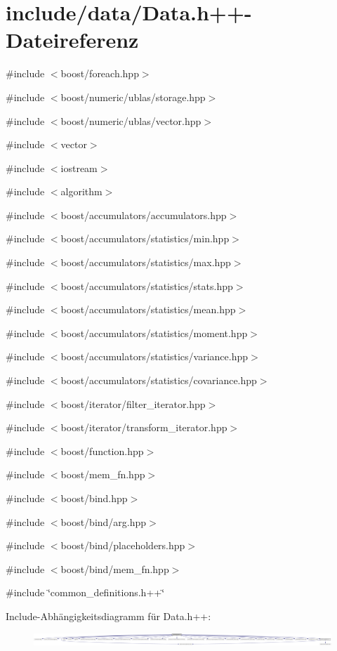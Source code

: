 \hypertarget{Data_8h_09_09}{
\section{include/data/Data.h++-\/Dateireferenz}
\label{Data_8h_09_09}
}
{\ttfamily \#include $<$boost/foreach.hpp$>$}\par
{\ttfamily \#include $<$boost/numeric/ublas/storage.hpp$>$}\par
{\ttfamily \#include $<$boost/numeric/ublas/vector.hpp$>$}\par
{\ttfamily \#include $<$vector$>$}\par
{\ttfamily \#include $<$iostream$>$}\par
{\ttfamily \#include $<$algorithm$>$}\par
{\ttfamily \#include $<$boost/accumulators/accumulators.hpp$>$}\par
{\ttfamily \#include $<$boost/accumulators/statistics/min.hpp$>$}\par
{\ttfamily \#include $<$boost/accumulators/statistics/max.hpp$>$}\par
{\ttfamily \#include $<$boost/accumulators/statistics/stats.hpp$>$}\par
{\ttfamily \#include $<$boost/accumulators/statistics/mean.hpp$>$}\par
{\ttfamily \#include $<$boost/accumulators/statistics/moment.hpp$>$}\par
{\ttfamily \#include $<$boost/accumulators/statistics/variance.hpp$>$}\par
{\ttfamily \#include $<$boost/accumulators/statistics/covariance.hpp$>$}\par
{\ttfamily \#include $<$boost/iterator/filter\_\-iterator.hpp$>$}\par
{\ttfamily \#include $<$boost/iterator/transform\_\-iterator.hpp$>$}\par
{\ttfamily \#include $<$boost/function.hpp$>$}\par
{\ttfamily \#include $<$boost/mem\_\-fn.hpp$>$}\par
{\ttfamily \#include $<$boost/bind.hpp$>$}\par
{\ttfamily \#include $<$boost/bind/arg.hpp$>$}\par
{\ttfamily \#include $<$boost/bind/placeholders.hpp$>$}\par
{\ttfamily \#include $<$boost/bind/mem\_\-fn.hpp$>$}\par
{\ttfamily \#include \char`\"{}common\_\-definitions.h++\char`\"{}}\par
Include-\/Abhängigkeitsdiagramm für Data.h++:\nopagebreak
\begin{figure}[H]
\begin{center}
\leavevmode
\includegraphics[width=420pt]{Data_8h_09_09__incl}
\end{center}
\end{figure}

